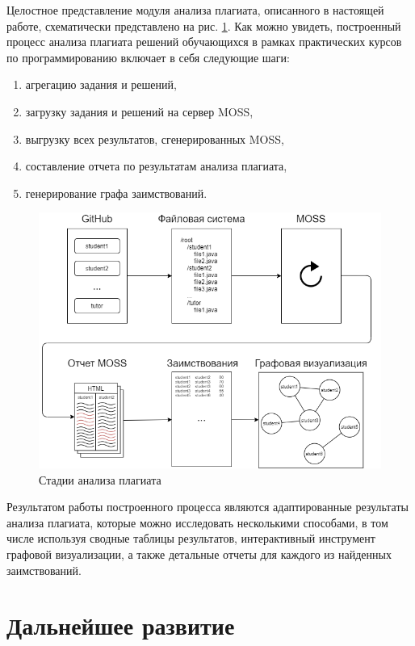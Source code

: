 \documentclass[a4paper,14pt]{extarticle}
\begin{document}
Целостное представление модуля анализа плагиата, описанного в настоящей работе, схематически представлено на рис. \ref{fig:pipeline}. Как можно увидеть, построенный процесс анализа плагиата решений обучающихся в рамках практических курсов по программированию включает в себя следующие шаги:

\begin{enumerate}
    \item агрегацию задания и решений,
    \item загрузку задания и решений на сервер MOSS,
    \item выгрузку всех результатов, сгенерированных MOSS,
    \item составление отчета по результатам анализа плагиата,
    \item генерирование графа заимствований.
\end{enumerate}

\begin{figure}[h!]
\centering
\includegraphics[width=1.0\textwidth]{plagiarism_pipeline.png}
\caption{Стадии анализа плагиата}
\label{fig:pipeline}
\end{figure}

Результатом работы построенного процесса являются адаптированные результаты анализа плагиата, которые можно исследовать несколькими способами, в том числе используя сводные таблицы результатов, интерактивный инструмент графовой визуализации, а также детальные отчеты для каждого из найденных заимствований.

\section{Дальнейшее развитие}
\end{document}
